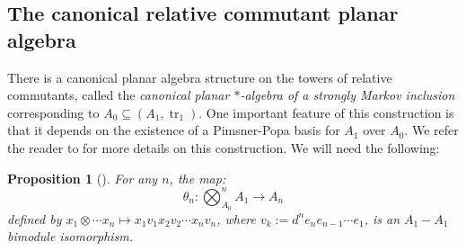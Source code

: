 \documentclass[11pt]{article}
\theoremstyle{plain}
\newtheorem{prop}[thm]{Proposition}
\theoremstyle{definition}
\newtheorem{defn}[thm]{Definition}
\DeclareMathOperator{\Tr}{Tr}
\DeclareMathOperator{\tr}{tr}
\newcommand{\nn}[1]{\textcolor{red}{[[#1]]}}
\begin{document}
%
%
%


\subsection{The canonical relative commutant planar algebra}%
\label{sec:StronglyMarkovPA}
\label{ssec:canonical}


There is a canonical planar algebra structure on the towers of relative commutants, called the \textit{canonical planar $\ast$-algebra of a strongly Markov inclusion} corresponding to $A_0\subseteq (A_1,\tr_1)$. One important feature of this construction is that it depends on the existence of a Pimsner-Popa basis for $A_1$ over $A_0$. 
We refer the reader to \cite{MR2812459} for more details on this construction. 
We will need the following:
\begin{prop}[{\cite[Prop 2.25]{MR2812459}}]\label{iso}
For any $n$, the map:
\[
\theta_n: \bigotimes_{A_0}^{n}A_1 \rightarrow A_n
\]
defined by $x_1\otimes\cdots x_n \mapsto x_1v_1x_2v_2\cdots x_nv_n$, where $v_k:=d^ne_ne_{n-1}\cdots e_1$, is an $A_1-A_1$ bimodule isomorphism.
\end{prop}
\end{document}
